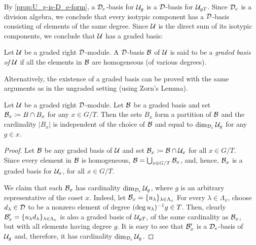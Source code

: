 
By \cref{prop:U_g-is-D_e-form}, a $\mathcal{D}_e$-basis for $\mathcal U_g$ is a $\mathcal{D}$-basis for $\mathcal U_{gT}$. 
Since $\mathcal{D}_e$ is a division algebra, we conclude that every isotypic component has a $\mathcal{D}$-basis consisting of elements of the same degree. 
Since $\mathcal U$ is the direct sum of its isotypic components, we conclude that $\mathcal U$ has a graded basis:

\begin{defi}
    Let $\mathcal U$ be a graded right $\mathcal{D}$-module. 
    A $\mathcal{D}$-basis $\mathcal B$ of $\mathcal U$ is said to be a \emph{graded basis of $\mathcal U$} if all the elements in $\mathcal B$ are homogeneous (of various degrees).
\end{defi}

\begin{remark}
    Alternatively, the existence of a graded basis can be proved with the same arguments as in the ungraded setting (using Zorn's Lemma).
\end{remark}

\begin{prop}\label{prop:dim-U_x}
    Let $\mathcal U$ be a graded right $\mathcal{D}$-module. 
    Let $\mathcal B$ be a graded basis and set $\mathcal B_x \coloneqq B \cap B_x$ for any $x\in G/T$. 
    Then the sets $B_x$ form a partition of $\mathcal B$ and the cardinality $|B_x|$ is independent of the choice of $\mathcal B$ and equal to $\dim_{\mathcal{D}_e} \mathcal U_g$ for any $g\in x$. 
\end{prop}

\begin{proof}
    Let $\mathcal B$ be any graded basis of $\mathcal U$ and set $\mathcal B_x \coloneqq \mathcal B \cap \mathcal U_x$ for all $x\in G/T$. 
    Since every element in $\mathcal B$ is homogeneous, $\mathcal B = \bigcup_{x \in G/T} \mathcal B_x$, and, hence, $\mathcal B_x$ is a graded basis for $\mathcal U_x$, for all $x\in G/T$.
    
    We claim that each $\mathcal B_x$ has cardinality $\dim_{\mathcal{D}_e} \mathcal U_g$, where $g$ is an arbitrary representative of the coset $x$. 
    Indeed, let $\mathcal B_x = \{ u_\lambda\}_{\lambda \in \Lambda_x}$
    For every $\lambda \in \Lambda_x$, choose $d_\lambda \in \mathcal{D}$ to be a nonzero element of degree $(\deg u_\lambda)^{-1} g \in T$. 
    Then, clearly $\mathcal B_x' = \{u_\lambda d_\lambda \}_{\lambda \in \Lambda_x}$ is also a graded basis of $\mathcal U_{gT}$, of the same cardinality as $\mathcal B_x$, but with all elements having degree $g$. 
    It is easy to see that $\mathcal B_x'$ is a $\mathcal{D}_e$-basis of $\mathcal U_g$ and, therefore, it has cardinality $\dim_{\mathcal{D}_e} \mathcal U_g$. 
\end{proof}

